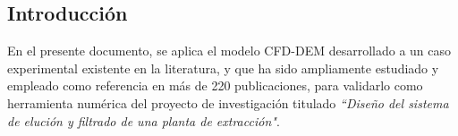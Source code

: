 \begin{center}
	\section{Introducci\'on}
\end{center}

\noindent
\justify

En el presente documento, se aplica el modelo CFD-DEM desarrollado a un caso experimental existente en la literatura, y que ha sido ampliamente estudiado y empleado como referencia en m\'as de 220 publicaciones, para validarlo como herramienta num\'erica del proyecto de investigaci\'on titulado \textit{``Dise\~no del sistema de eluci\'on y filtrado de una planta de extracci\'on"}. 